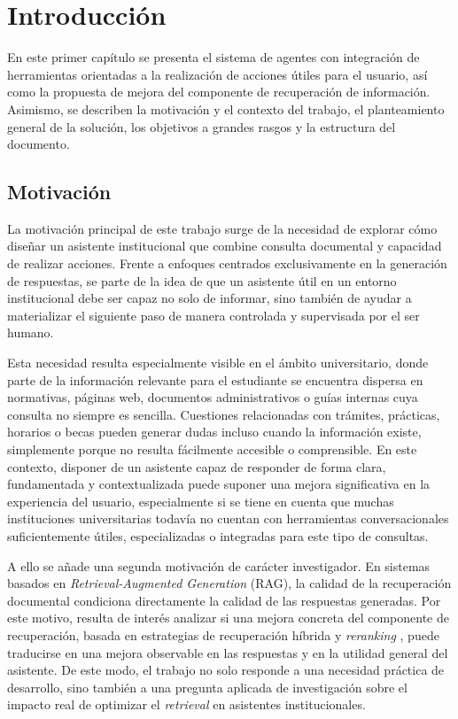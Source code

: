 \chapter{Introducción}\label{chap:introduccion}

En este primer capítulo se presenta el sistema de agentes con integración de herramientas orientadas a la realización de acciones útiles para el usuario, así como la propuesta de mejora del componente de recuperación de información. 
Asimismo, se describen la motivación y el contexto del trabajo, el planteamiento general de la solución, los objetivos a grandes rasgos y la estructura del documento.

\section{Motivación}

La motivación principal de este trabajo surge de la necesidad de explorar cómo diseñar un asistente institucional que combine consulta documental y capacidad de realizar acciones. 
Frente a enfoques centrados exclusivamente en la generación de respuestas, se parte de la idea de que un asistente útil en un entorno institucional debe ser capaz no solo de informar, sino también de ayudar a materializar el siguiente paso de manera controlada y supervisada por el ser humano.

Esta necesidad resulta especialmente visible en el ámbito universitario, donde parte de la información relevante para el estudiante se encuentra dispersa en normativas, páginas web, documentos administrativos o guías internas cuya consulta no siempre es sencilla. 
Cuestiones relacionadas con trámites, prácticas, horarios o becas pueden generar dudas incluso cuando la información existe, simplemente porque no resulta fácilmente accesible o comprensible. 
En este contexto, disponer de un asistente capaz de responder de forma clara, fundamentada y contextualizada puede suponer una mejora significativa en la experiencia del usuario, especialmente si se tiene en cuenta que muchas instituciones universitarias todavía no cuentan con herramientas conversacionales suficientemente útiles, especializadas o integradas para este tipo de consultas.

A ello se añade una segunda motivación de carácter investigador. 
En sistemas basados en \textit{Retrieval-Augmented Generation} (RAG), la calidad de la recuperación documental condiciona directamente la calidad de las respuestas generadas. 
Por este motivo, resulta de interés analizar si una mejora concreta del componente de recuperación, basada en estrategias de recuperación híbrida y \textit{reranking} \parencite{nogueira2020monot5}, puede traducirse en una mejora observable en las respuestas y en la utilidad general del asistente. 
De este modo, el trabajo no solo responde a una necesidad práctica de desarrollo, sino también a una pregunta aplicada de investigación sobre el impacto real de optimizar el \textit{retrieval} en asistentes institucionales.

